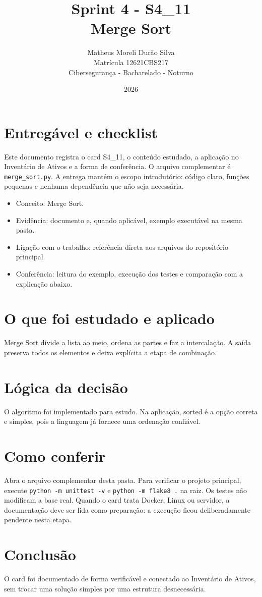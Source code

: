 \documentclass[12pt]{article}
\title{Sprint 4 - S4\_11\\Merge Sort}
\author{Matheus Moreli Durão Silva\\ Matrícula 12621CBS217\\ Cibersegurança - Bacharelado - Noturno}
\date{2026}
\begin{document}
\maketitle

\section*{Entregável e checklist}
Este documento registra o card S4\_11, o conteúdo estudado, a aplicação no Inventário de Ativos e a forma de conferência. O arquivo complementar é \texttt{merge\_sort.py}. A entrega mantém o escopo introdutório: código claro, funções pequenas e nenhuma dependência que não seja necessária.

\begin{itemize}
\item Conceito: Merge Sort.
\item Evidência: documento e, quando aplicável, exemplo executável na mesma pasta.
\item Ligação com o trabalho: referência direta aos arquivos do repositório principal.
\item Conferência: leitura do exemplo, execução dos testes e comparação com a explicação abaixo.
\end{itemize}

\section*{O que foi estudado e aplicado}
Merge Sort divide a lista ao meio, ordena as partes e faz a intercalação. A saída preserva todos os elementos e deixa explícita a etapa de combinação.

\section*{Lógica da decisão}
O algoritmo foi implementado para estudo. Na aplicação, sorted é a opção correta e simples, pois a linguagem já fornece uma ordenação confiável.

\section*{Como conferir}
Abra o arquivo complementar desta pasta. Para verificar o projeto principal, execute \texttt{python -m unittest -v} e \texttt{python -m flake8 .} na raiz. Os testes não modificam a base real. Quando o card trata Docker, Linux ou servidor, a documentação deve ser lida como preparação: a execução ficou deliberadamente pendente nesta etapa.

\section*{Conclusão}
O card foi documentado de forma verificável e conectado ao Inventário de Ativos, sem trocar uma solução simples por uma estrutura desnecessária.
\end{document}
